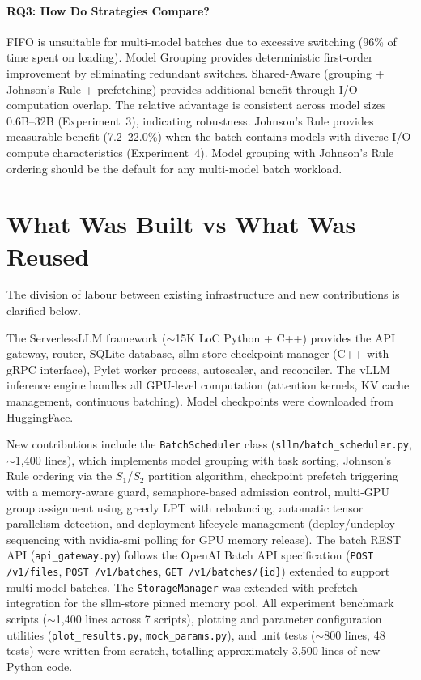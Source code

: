 \documentclass[logo,bsc,singlespacing,parskip,online]{infthesis}
\begin{document}
\paragraph{RQ3: How Do Strategies Compare?}

FIFO is unsuitable for multi-model batches due to excessive switching (96\% of time spent on loading). Model Grouping provides deterministic first-order improvement by eliminating redundant switches. Shared-Aware (grouping + Johnson's Rule + prefetching) provides additional benefit through I/O-computation overlap. The relative advantage is consistent across model sizes 0.6B--32B (Experiment~3), indicating robustness. Johnson's Rule provides measurable benefit (7.2--22.0\%) when the batch contains models with diverse I/O-compute characteristics (Experiment~4). Model grouping with Johnson's Rule ordering should be the default for any multi-model batch workload.

\section{What Was Built vs What Was Reused}

The division of labour between existing infrastructure and new contributions is clarified below.

The ServerlessLLM framework ($\sim$15K LoC Python + C++) provides the API gateway, router, SQLite database, sllm-store checkpoint manager (C++ with gRPC interface), Pylet worker process, autoscaler, and reconciler. The vLLM inference engine handles all GPU-level computation (attention kernels, KV cache management, continuous batching). Model checkpoints were downloaded from HuggingFace.

New contributions include the \texttt{BatchScheduler} class (\texttt{sllm/batch\_scheduler.py}, $\sim$1,400 lines), which implements model grouping with task sorting, Johnson's Rule ordering via the $S_1$/$S_2$ partition algorithm, checkpoint prefetch triggering with a memory-aware guard, semaphore-based admission control, multi-GPU group assignment using greedy LPT with rebalancing, automatic tensor parallelism detection, and deployment lifecycle management (deploy/undeploy sequencing with nvidia-smi polling for GPU memory release). The batch REST API (\texttt{api\_gateway.py}) follows the OpenAI Batch API specification (\texttt{POST /v1/files}, \texttt{POST /v1/batches}, \texttt{GET /v1/batches/\{id\}}) extended to support multi-model batches. The \texttt{StorageManager} was extended with prefetch integration for the sllm-store pinned memory pool. All experiment benchmark scripts ($\sim$1,400 lines across 7 scripts), plotting and parameter configuration utilities (\texttt{plot\_results.py}, \texttt{mock\_params.py}), and unit tests ($\sim$800 lines, 48 tests) were written from scratch, totalling approximately 3,500 lines of new Python code.
\end{document}
